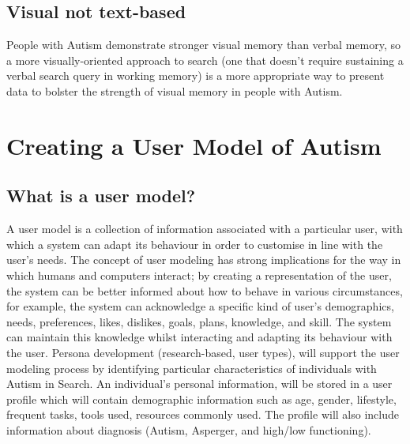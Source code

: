 \documentclass[10pt]{article}
\begin{document}
\subsection{Visual not text-based}
People with Autism demonstrate stronger visual memory \cite{fabienne} than verbal memory, so a more visually-oriented approach to search (one that doesn’t require sustaining a verbal search query in working memory) is a more appropriate way to present data to bolster the strength of visual memory in people with Autism.


\section {Creating a User Model of Autism}\label{usermodel}
\subsection{What is a user model?}
A user model is a collection of information associated with a particular user, with which a system can adapt its behaviour in order to customise in line with the user’s needs. The concept of user modeling has strong implications for the way in which humans and computers interact; by creating a representation of the user, the system can be better informed about how to behave in various circumstances, for example, the system can acknowledge a specific kind of user’s demographics, needs, preferences, likes, dislikes, goals, plans, knowledge, and skill. The system can maintain this knowledge whilst interacting and adapting its behaviour with the user.
Persona development (research-based, user types), will support the user modeling process by identifying particular characteristics of individuals with Autism in Search. An individual’s personal information, will be stored in a user profile which will contain demographic information such as age, gender, lifestyle, frequent tasks, tools used, resources commonly used. The profile will also include information about diagnosis (Autism, Asperger, and high/low functioning).
\end{document}
